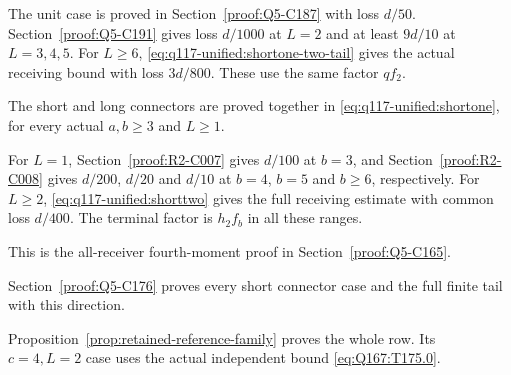 \begin{description}[style=nextline,leftmargin=1.6em]
\item[{$(1,\allowbreak 2)$; $F=\allowbreak qf_2$; $L\ge\allowbreak 1$; $\epsilon=\allowbreak 1/1000$}]
\label{row:Dfull:12}
The unit case is proved in Section~\ref{proof:Q5-C187} with loss $d/50$.
Section~\ref{proof:Q5-C191} gives loss $d/1000$ at $L=\allowbreak 2$ and at least
$9d/10$ at $L=\allowbreak 3,\allowbreak 4,\allowbreak 5$.
For $L\ge\allowbreak6$, \eqref{eq:q117-unified:shortone-two-tail}
gives the actual receiving bound with loss $3d/800$. These use the same factor $qf_2$.

\item[{$(1,\allowbreak b)$, $b\ge\allowbreak 3$; $F=\allowbreak qf_b$; $L\ge\allowbreak 1$; $\epsilon=\allowbreak 1/3000$}]
\label{row:Dfull:1b}
The short and long connectors are proved together in
\eqref{eq:q117-unified:shortone}, for every actual $a,b\ge\allowbreak3$
and $L\ge\allowbreak1$.

\item[{$(2,\allowbreak b)$, $b\ge\allowbreak 3$; $F=\allowbreak h_2f_b$; $L\ge\allowbreak 1$; $\epsilon=\allowbreak 1/400$}]
\label{row:Dfull:2b}
For $L=\allowbreak 1$, Section~\ref{proof:R2-C007} gives $d/100$ at $b=\allowbreak 3$,
and Section~\ref{proof:R2-C008} gives $d/200$, $d/20$ and $d/10$
at $b=\allowbreak 4$, $b=\allowbreak 5$ and $b\ge\allowbreak 6$, respectively.
For $L\ge\allowbreak2$, \eqref{eq:q117-unified:shorttwo}
gives the full receiving estimate with common loss $d/400$.
The terminal factor is $h_2f_b$ in all these ranges.

\item[{$(1,\allowbreak 2,\allowbreak 3)$; $F=\allowbreak qf_2\bar f_3$; $L=\allowbreak 1$; $\epsilon=\allowbreak 1/256$}]
\label{row:Dfull:123unit}
This is the all-receiver fourth-moment proof in
Section~\ref{proof:Q5-C165}.

\item[{$(1,\allowbreak 2,\allowbreak 3)$; $F=\allowbreak qf_2h_3$; $L\ge\allowbreak 2$; $\epsilon=\allowbreak 1/16$}]
\label{row:Dfull:123tail}
Section~\ref{proof:Q5-C176} proves every short connector case and the
full finite tail with this direction.

\item[{$(1,\allowbreak 2,\allowbreak c)$, $c\ge\allowbreak 4$; $F=\allowbreak qf_2h_c$; $L\ge\allowbreak 1$; $\epsilon=\allowbreak 1/800$}]
\label{row:Dfull:12c}
Proposition~\ref{prop:retained-reference-family} proves the whole row.
Its $c=4,L=2$ case uses the actual independent bound
\eqref{eq:Q167:T175.0}.


\end{description}
